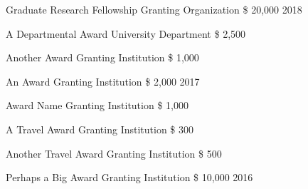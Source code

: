 
\begin{cvhonors}

  \cvhonor
    {Graduate Research Fellowship} %
    {Granting Organization} %
    {\$ 20,000} %
    {2018} %

  \cvhonor
    {A Departmental Award} %
    {University Department} %
    {\$ 2,500} %
    {} %

  \cvhonor
    {Another Award} %
    {Granting Institution} %
    {\$ 1,000} %
    {} %

\end{cvhonors}

\begin{cvhonors}

  \cvhonor
    {An Award} %
    {Granting Institution} %
    {\$ 2,000} %
    {2017} %

  \cvhonor
    {Award Name} %
    {Granting Institution} %
    {\$ 1,000} %
    {} %

  \cvhonor
    {A Travel Award} %
    {Granting Institution} %
    {\$ 300} %
    {} %

  \cvhonor
    {Another Travel Award} %
    {Granting Institution} %
    {\$ 500} %
    {} %

\end{cvhonors}

\begin{cvhonors}

  \cvhonor
    {Perhaps a Big Award} %
    {Granting Institution} %
    {\$ 10,000} %
    {2016} %

\end{cvhonors}